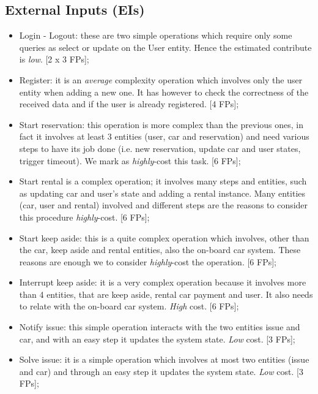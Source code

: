\documentclass{scrreprt}
\begin{document}
\subsection{External Inputs (EIs)}
\begin{itemize}
\item Login - Logout: these are two simple operations which require only some queries as select or update on the User entity. Hence the estimated contribute is \emph{low}. [2 x 3 FPs];

\item Register: it is an \emph{average} complexity operation which involves only the user entity when adding a new one. It has however to check the correctness of the received data and if the user is already registered. [4 FPs];

\item Start reservation: this operation is more complex than the previous ones, in fact it involves at least 3 entities (user, car and reservation) and need various steps to have its job done (i.e. new reservation, update car and user states, trigger timeout).
We mark as \emph{highly}-cost this task. [6 FPs];

\item Start rental is a complex operation; it involves many steps and entities, such as updating car and user's state and adding a rental instance. Many entities (car, user and rental) involved and different steps are the reasons to consider this procedure \emph{highly}-cost. [6 FPs];

\item Start keep aside: this is a quite complex operation which involves, other than the car, keep aside and rental entities, also the on-board car system.
These reasons are enough we to consider \emph{highly}-cost the operation. [6 FPs];

\item Interrupt keep aside: it is a very complex operation because it involves more than 4 entities, that are keep aside, rental car payment and user. It also needs to relate with the on-board car system. \emph{High} cost. [6 FPs];

\item Notify issue: this simple operation interacts with the two entities issue and car, and with an easy step it updates the system state. \emph{Low} cost. [3 FPs];

\item Solve issue: it is a simple operation which involves at most two entities (issue and car) and through an easy step it updates the system state. \emph{Low} cost. [3 FPs];


\end{itemize}
\end{document}
